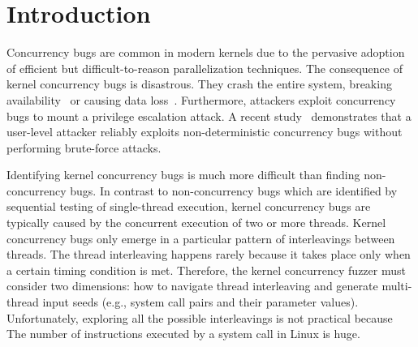 \section{Introduction}
\label{s:intro}



Concurrency bugs are common in modern kernels due to 
the pervasive adoption of efficient but difficult-to-reason
parallelization techniques.
The consequence of kernel concurrency bugs is disastrous. They crash
the entire system, breaking availability~\cite{cve201812232, snowboardbug} or causing data loss~\cite{dataloss}.
Furthermore, attackers 
exploit concurrency bugs to mount a privilege escalation attack.
A recent study~\cite{exprace} demonstrates that a user-level attacker 
reliably exploits non-deterministic concurrency bugs without performing
brute-force attacks.

Identifying kernel concurrency bugs is much more difficult than 
finding non-concurrency bugs. 
In contrast to non-concurrency bugs which are identified by 
sequential testing of single-thread execution,
kernel concurrency bugs are typically caused by the concurrent execution 
of two or more threads. 
Kernel concurrency bugs only emerge in a particular pattern of 
interleavings between threads. The thread interleaving happens 
rarely because it takes place only when a certain timing condition is met.
Therefore, the kernel concurrency fuzzer must consider two dimensions: 
how to navigate thread interleaving and generate multi-thread input seeds (e.g., system call pairs and their parameter values).
Unfortunately, exploring all the possible interleavings is not practical because 
The number of instructions executed by a system call in Linux is huge.

